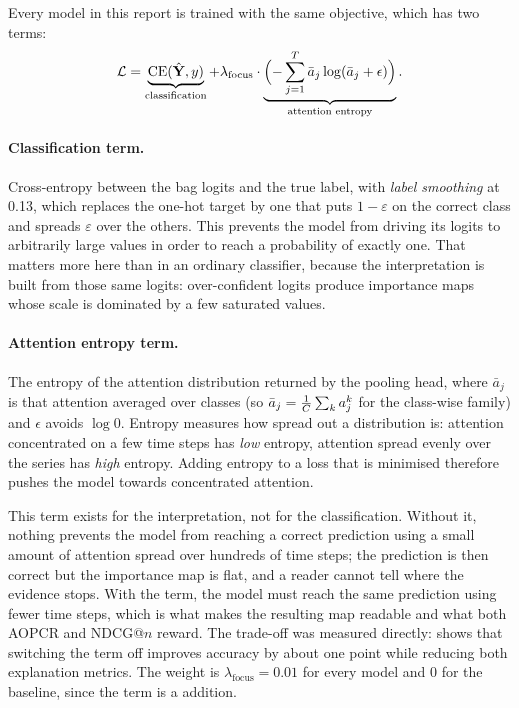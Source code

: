 Every model in this report is trained with the same objective, which has two terms:
\begin{equation}
  \mathcal{L} = \underbrace{\mathrm{CE}(\hat{\mathbf{Y}}, y)}_{\text{classification}}
              + \lambda_{\text{focus}} \cdot
                \underbrace{\Big({-}\sum_{j=1}^{T} \bar a_j \log(\bar a_j + \epsilon)\Big)}_{\text{attention entropy}} .
  \label{eq:loss}
\end{equation}

\paragraph{Classification term.}
Cross-entropy between the bag logits and the true label, with \emph{label smoothing} at 0.13, which
replaces the one-hot target by one that puts $1-\varepsilon$ on the correct class and spreads
$\varepsilon$ over the others. This prevents the model from driving its logits to arbitrarily large
values in order to reach a probability of exactly one. That matters more here than in an ordinary
classifier, because the interpretation is built from those same logits: over-confident logits produce
importance maps whose scale is dominated by a few saturated values.

\paragraph{Attention entropy term.}
The entropy of the attention distribution returned by the pooling head, where $\bar a_j$ is that
attention averaged over classes (so $\bar a_j = \frac{1}{C}\sum_k a_j^k$ for the class-wise
family) and $\epsilon$ avoids $\log 0$. Entropy measures how spread out a distribution is: attention
concentrated on a few time steps has \emph{low} entropy, attention spread evenly over the series has
\emph{high} entropy. Adding entropy to a loss that is minimised therefore pushes the model towards
concentrated attention.

This term exists for the interpretation, not for the classification. Without it, nothing prevents
the model from reaching a correct prediction using a small amount of attention spread over hundreds
of time steps; the prediction is then correct but the importance map is flat, and a reader cannot
tell where the evidence stops. With the term, the model must reach the same prediction using fewer
time steps, which is what makes the resulting map readable and what both AOPCR and NDCG@$n$ reward.
The trade-off was measured directly:  shows that switching the term off
improves accuracy by about one point while reducing both explanation metrics. The weight is
$\lambda_{\text{focus}} = 0.01$ for every \seanet{} model and $0$ for the \millet{} baseline, since
the term is a \seanet{} addition.
